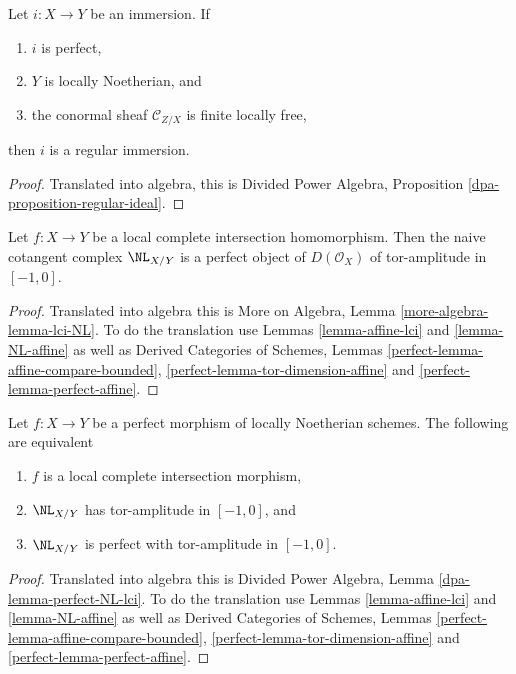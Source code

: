\begin{lemma}
\label{lemma-perfect-conormal-free-lci}
Let $i : X \to Y$ be an immersion. If
\begin{enumerate}
\item $i$ is perfect,
\item $Y$ is locally Noetherian, and
\item the conormal sheaf $\mathcal{C}_{Z/X}$ is finite locally free,
\end{enumerate}
then $i$ is a regular immersion.
\end{lemma}

\begin{proof}
Translated into algebra, this is
Divided Power Algebra, Proposition \ref{dpa-proposition-regular-ideal}.
\end{proof}

\begin{lemma}
\label{lemma-lci-NL}
Let $f : X \to Y$ be a local complete intersection homomorphism.
Then the naive cotangent complex $\NL_{X/Y}$ is a perfect object
of $D(\mathcal{O}_X)$ of tor-amplitude in $[-1, 0]$.
\end{lemma}

\begin{proof}
Translated into algebra this is
More on Algebra, Lemma \ref{more-algebra-lemma-lci-NL}.
To do the translation use
Lemmas \ref{lemma-affine-lci} and
\ref{lemma-NL-affine} as well as
Derived Categories of Schemes, Lemmas
\ref{perfect-lemma-affine-compare-bounded},
\ref{perfect-lemma-tor-dimension-affine} and
\ref{perfect-lemma-perfect-affine}.
\end{proof}

\begin{lemma}
\label{lemma-perfect-NL-lci}
Let $f : X \to Y$ be a perfect morphism of locally Noetherian schemes.
The following are equivalent
\begin{enumerate}
\item $f$ is a local complete intersection morphism,
\item $\NL_{X/Y}$ has tor-amplitude in $[-1, 0]$, and
\item $\NL_{X/Y}$ is perfect with tor-amplitude in $[-1, 0]$.
\end{enumerate}
\end{lemma}

\begin{proof}
Translated into algebra this is
Divided Power Algebra, Lemma \ref{dpa-lemma-perfect-NL-lci}.
To do the translation use
Lemmas \ref{lemma-affine-lci} and
\ref{lemma-NL-affine} as well as
Derived Categories of Schemes, Lemmas
\ref{perfect-lemma-affine-compare-bounded},
\ref{perfect-lemma-tor-dimension-affine} and
\ref{perfect-lemma-perfect-affine}.
\end{proof}

